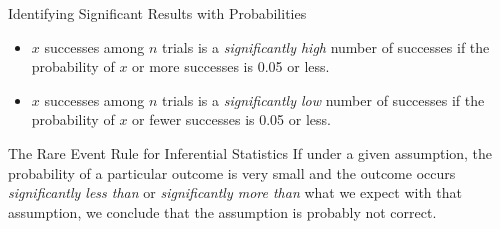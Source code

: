 \documentclass{beamer}
\begin{document}
\begin{frame}
\begin{block}{Identifying Significant Results with Probabilities}
\begin{itemize}
\item $x$ successes among $n$ trials is a \emph{significantly high} number of successes if the probability of $x$ or more successes is 0.05 or less.
\item $x$ successes among $n$ trials is a \emph{significantly low} number of successes if the probability of $x$ or fewer successes is 0.05 or less.
\end{itemize}
\end{block}\pause

\begin{block}{The Rare Event Rule for Inferential Statistics}
If under a given assumption, the probability of a particular outcome is very small and the outcome occurs \emph{significantly less than} or \emph{significantly more than} what we expect with that assumption, we conclude that the assumption is probably not correct.
\end{block}
\end{frame}
\end{document}
